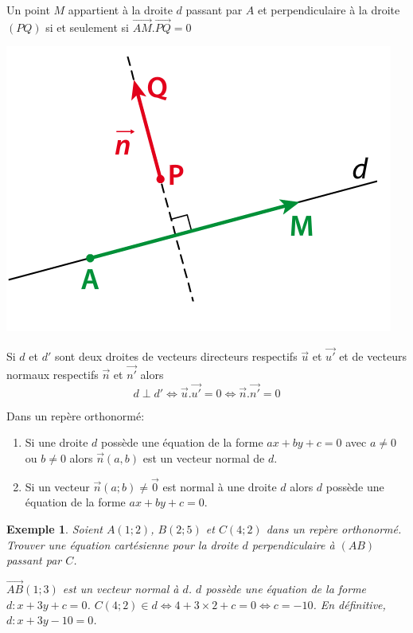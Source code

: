 \documentclass[a4paper,11pt]{article}
\theoremstyle{break}
\newcounter{enonce}
\newtheorem{exemple}[enonce]{Exemple}
\begin{document}
 \begin{proposition}
  Un point $M$ appartient à la droite $d$ passant par $A$ et perpendiculaire à la droite $(PQ)$
  si et seulement si $\vec{AM}.\vec{PQ}=0$
  
     \begin{center}
    \includegraphics[scale=0.5]{../Images/vecNormal.png}
  \end{center}
  
  Si $d$ et $d'$ sont deux droites de vecteurs directeurs respectifs $\vec{u}$ et $\vec{u'}$ et 
  de vecteurs normaux respectifs $\vec{n}$ et $\vec{n'}$ alors
  $$ d \perp d' \Leftrightarrow \vec{u}.\vec{u'}=0 \Leftrightarrow \vec{n}.\vec{n'}=0$$
 \end{proposition}
 
 \begin{theorem}
  Dans un repère orthonormé:
  \begin{enumerate}
   \item Si une droite $d$ possède une équation de la forme $ax+by+c=0$ avec $a \neq0$ ou
   $b \neq 0$ alors $\vec{n}(a,b)$ est un vecteur normal de $d$.
   \item Si un vecteur $\vec{n}(a;b) \neq \vec{0}$ est normal à une droite $d$ alors
   $d$ possède une équation de la forme $ax+by+c=0$.
  \end{enumerate}

 \end{theorem}
 
 \begin{exemple}
  Soient $A(1;2)$, $B(2;5)$ et $C(4;2)$ dans un repère orthonormé. Trouver une équation 
  cartésienne pour la droite $d$ perpendiculaire à $(AB)$ passant par $C$.
  
  $\vec{AB}(1;3)$ est un vecteur normal à $d$. $d$ possède une équation de la forme $d:x+3y+c=0$.
  $C(4;2) \in d \Leftrightarrow 4+3 \times 2+c=0 \Leftrightarrow c=-10$. En définitive,
  $d:x+3y-10=0$.
 \end{exemple}
\end{document}
